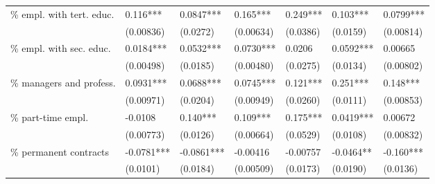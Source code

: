 \documentclass[12pt]{article}
\begin{document}
\begin{table}[hbt]
{\begin{threeparttable}
\begin{tabular}{l*{6}{l}}
\% empl. with tert. educ.                   &       0.116***    & 0.0847***   & 0.165***   & 0.249***    & 0.103***   & 0.0799***    \\
                                            &       (0.00836)   & (0.0272)    & (0.00634)  & (0.0386)    & (0.0159)   & (0.00814)    \\[1ex]
\% empl. with sec. educ.                    &       0.0184***   & 0.0532***   & 0.0730***  & 0.0206      & 0.0592***  & 0.00665      \\
                                            &       (0.00498)   & (0.0185)    & (0.00480)  & (0.0275)    & (0.0134)   & (0.00802)    \\[1ex]
\% managers and profess.                    &       0.0931***   & 0.0688***   & 0.0745***  & 0.121***    & 0.251***   & 0.148***     \\
                                            &       (0.00971)   & (0.0204)    & (0.00949)  & (0.0260)    & (0.0111)   & (0.00853)    \\[1ex]
\% part-time empl.                          &       -0.0108     & 0.140***    & 0.109***   & 0.175***    & 0.0419***  & 0.00672      \\
                                            &       (0.00773)   & (0.0126)    & (0.00664)  & (0.0529)    & (0.0108)   & (0.00832)    \\[1ex]
\% permanent contracts                      &       -0.0781***  & -0.0861***  & -0.00416   & -0.00757    & -0.0464**  & -0.160***    \\
                                            &       (0.0101)    & (0.0184)    & (0.00509)  & (0.0173)    & (0.0190)   & (0.0136)     \\[1ex]


\end{tabular}
\end{threeparttable}}
\end{table}
\end{document}
